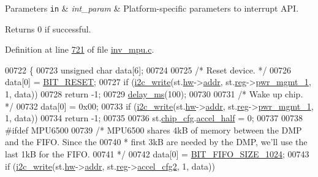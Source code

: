 \begin{DoxyParams}[1]{Parameters}
\mbox{\tt in}  & {\em int\+\_\+param} & Platform-\/specific parameters to interrupt A\+PI. \\
\hline
\end{DoxyParams}
\begin{DoxyReturn}{Returns}
0 if successful. 
\end{DoxyReturn}


Definition at line \hyperlink{inv__mpu_8c_source_l00721}{721} of file \hyperlink{inv__mpu_8c_source}{inv\+\_\+mpu.\+c}.


\begin{DoxyCode}
00722 \{
00723     \textcolor{keywordtype}{unsigned} \textcolor{keywordtype}{char} data[6];
00724 
00725     \textcolor{comment}{/* Reset device. */}
00726     data[0] = \hyperlink{inv__mpu_8c_af4ce49fd1fc9b1461b5241f9ef4812f4}{BIT\_RESET};
00727     \textcolor{keywordflow}{if} (\hyperlink{_i2_c_8c_ac0f145afe8d662af199043939f4398d6}{i2c\_write}(st.\hyperlink{structgyro__state__s_a5bac30a96752691e4cc723735060e360}{hw}->\hyperlink{structhw__s_a4c34a946600e9d68b6355d23f54d291b}{addr}, st.\hyperlink{structgyro__state__s_ae857e1285c583b7438a208edd691a38e}{reg}->\hyperlink{structgyro__reg__s_ad746a196c317f0f4d557a92b9eb98d34}{pwr\_mgmt\_1}, 1, data))
00728         \textcolor{keywordflow}{return} -1;
00729     \hyperlink{inv__mpu_8c_ae36aca5baf9b6b7d74992aef00686d67}{delay\_ms}(100);
00730 
00731     \textcolor{comment}{/* Wake up chip. */}
00732     data[0] = 0x00;
00733     \textcolor{keywordflow}{if} (\hyperlink{_i2_c_8c_ac0f145afe8d662af199043939f4398d6}{i2c\_write}(st.\hyperlink{structgyro__state__s_a5bac30a96752691e4cc723735060e360}{hw}->\hyperlink{structhw__s_a4c34a946600e9d68b6355d23f54d291b}{addr}, st.\hyperlink{structgyro__state__s_ae857e1285c583b7438a208edd691a38e}{reg}->\hyperlink{structgyro__reg__s_ad746a196c317f0f4d557a92b9eb98d34}{pwr\_mgmt\_1}, 1, data))
00734         \textcolor{keywordflow}{return} -1;
00735 
00736    st.\hyperlink{structgyro__state__s_ac895217592e2084bd520b0be8e9d20ee}{chip\_cfg}.\hyperlink{structchip__cfg__s_af73df77287fdeba8d408c18f3905650f}{accel\_half} = 0;
00737 
00738 \textcolor{preprocessor}{#ifdef MPU6500}
00739     \textcolor{comment}{/* MPU6500 shares 4kB of memory between the DMP and the FIFO. Since the}
00740 \textcolor{comment}{     * first 3kB are needed by the DMP, we'll use the last 1kB for the FIFO.}
00741 \textcolor{comment}{     */}
00742     data[0] = \hyperlink{inv__mpu_8c_a3769fd3fa71deaef1e77ce14c26f679d}{BIT\_FIFO\_SIZE\_1024};
00743     \textcolor{keywordflow}{if} (\hyperlink{_i2_c_8c_ac0f145afe8d662af199043939f4398d6}{i2c\_write}(st.\hyperlink{structgyro__state__s_a5bac30a96752691e4cc723735060e360}{hw}->\hyperlink{structhw__s_a4c34a946600e9d68b6355d23f54d291b}{addr}, st.\hyperlink{structgyro__state__s_ae857e1285c583b7438a208edd691a38e}{reg}->\hyperlink{structgyro__reg__s_a4878318dd0c9243015d4963e00b2d954}{accel\_cfg2}, 1, data))

\end{DoxyCode}
